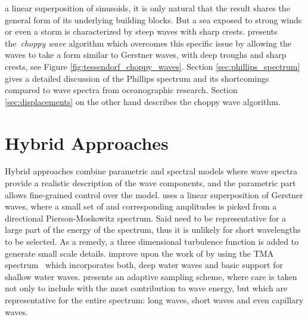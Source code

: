 a linear superposition of sinusoids, it is only natural that the result shares
the general form of its underlying building blocks. But a sea exposed to strong
winds or even a storm is characterized by steep waves with sharp crests.
\cite{course:simulatingocean} presents the~\emph{choppy wave} algorithm which
overcomes this specific issue by allowing the waves to take a form similar to
Gerstner waves, with deep troughs and sharp crests, see Figure
\ref{fig:tessendorf_choppy_waves}.
Section \ref{sec:phillips_spectrum} gives a detailed discussion of the Phillips
spectrum and its shortcomings compared to wave spectra from oceanographic
research. Section \ref{sec:displacements} on the other hand describes the choppy
wave algorithm.

\section{Hybrid Approaches}
Hybrid approaches combine parametric and spectral models where wave spectra
provide a realistic description of the wave components, and the parametric part
allows fine-grained control over the model.
\citeauthor{Thon:2000}\citep{Thon:2000,Thon:2002} uses a linear superposition
of Gerstner waves, where a small set of \wavevectors and corresponding
amplitudes is picked from a directional Pierson-Moskowitz spectrum. Said
\wavevectors need to be representative for a large part of the energy of the
spectrum, thus it is unlikely for short wavelengths to be selected. As a remedy,
a three dimensional turbulence function \citep{Perlin:1985} is added to generate
small scale details. \cite{lee:2007} improve upon the work of
\citeauthor{Thon:2000} by using the TMA spectrum~\citep{Hughes:1984} which
incorporates both, deep water waves and basic support for shallow water waves.
\cite{article:frechot2007} presents an adaptive sampling scheme, where care is
taken not only to include \wavevectors with the most contribution to wave
energy, but \wavevectors which are representative for the entire spectrum:
long waves, short waves and even capillary waves.

